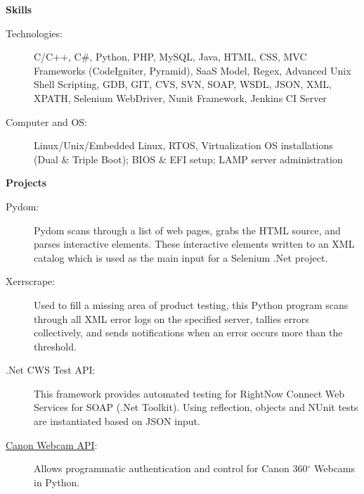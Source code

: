 \documentclass[letterpaper,11pt]{article}
\newcommand{\resheading}[1]{{\large \colorbox{mygrey}{\begin{minipage}{\textwidth}{\textbf{#1 \vphantom{p\^{E}}}}\end{minipage}}}}
\begin{document}
  \resheading{Skills}
  \begin{description}
    \item[Technologies:] { \footnotesize C/C++,
	C\#, Python, PHP, MySQL, Java, HTML, CSS,
	MVC Frameworks (CodeIgniter, Pyramid), SaaS Model,
	Regex, Advanced Unix Shell Scripting, GDB,
	GIT, CVS, SVN, SOAP, WSDL, JSON, XML, XPATH,
	Selenium
	WebDriver, Nunit Framework,
	Jenkins CI Server
      }
    \item[Computer and OS:] { \footnotesize
	Linux/Unix/Embedded Linux, RTOS,
	Virtualization OS installations
	(Dual \& Triple Boot);	BIOS \& EFI setup; LAMP server administration
      }
  \end{description} %

  \resheading{Projects}
  \begin{description}
    \item[Pydom:] { \footnotesize Pydom scans through a list of web pages, grabs the HTML source, and parses interactive elements. These interactive elements written to an XML catalog which is used as the main input for a Selenium .Net project.}

    \item[Xerrscrape:] { \footnotesize Used to fill a missing area of product testing, this Python program scans through all XML error logs on the specified server, tallies errors collectively, and sends notifications when an error occurs more than the threshold.}

    \item[.Net CWS Test API:] { \footnotesize This framework provides automated testing for RightNow Connect Web Services for SOAP (.Net Toolkit).  Using reflection, objects and NUnit tests are instantiated based on JSON input.}
    \item[\href{https://bitbucket.org/dhildreth/canon\_webview}{Canon Webcam API}:] {\footnotesize Allows programmatic authentication and control for Canon 360$^\circ$ Webcams in Python.}
  \end{description}

  
\end{document}
